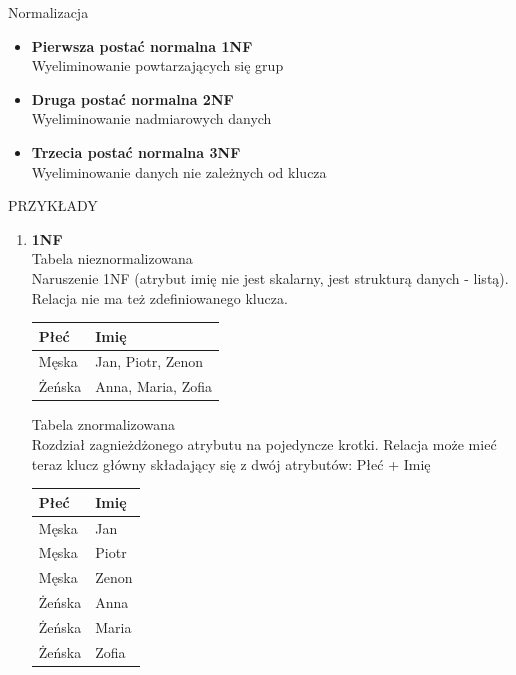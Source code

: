\documentclass[12pt]{article}
\begin{document}
    Normalizacja
    \begin{itemize}
        \item \textbf{Pierwsza postać normalna 1NF}\\
        Wyeliminowanie powtarzających się grup
        \item \textbf{Druga postać normalna 2NF}\\
        Wyeliminowanie nadmiarowych danych
        \item \textbf{Trzecia postać normalna 3NF}\\
        Wyeliminowanie danych nie zależnych od klucza
    \end{itemize}
    
    PRZYKŁADY
    \begin{enumerate}
        \item \textbf{1NF}\\
        Tabela nieznormalizowana\\
        Naruszenie 1NF (atrybut imię nie jest skalarny, jest strukturą danych - listą). Relacja nie ma też zdefiniowanego klucza.
        
        \begin{table}[H]
        \begin{tabular}{|l|l|}
        \hline
        Płeć   & Imię               \\ \hline
        Męska  & Jan, Piotr, Zenon  \\ \hline
        Żeńska & Anna, Maria, Zofia \\ \hline
        \end{tabular}
        \end{table}
        
        Tabela znormalizowana\\
        Rozdział zagnieżdżonego atrybutu na pojedyncze krotki. Relacja może mieć teraz klucz główny składający się z dwój atrybutów: Płeć + Imię
        
        \begin{table}[H]
        \begin{tabular}{|l|l|}
        \hline
        Płeć   & Imię  \\ \hline
        Męska  & Jan   \\ \hline
        Męska  & Piotr \\ \hline
        Męska  & Zenon \\ \hline
        Żeńska & Anna  \\ \hline
        Żeńska & Maria \\ \hline
        Żeńska & Zofia \\ \hline
        \end{tabular}
        \end{table}
        

\end{enumerate}
\end{document}

